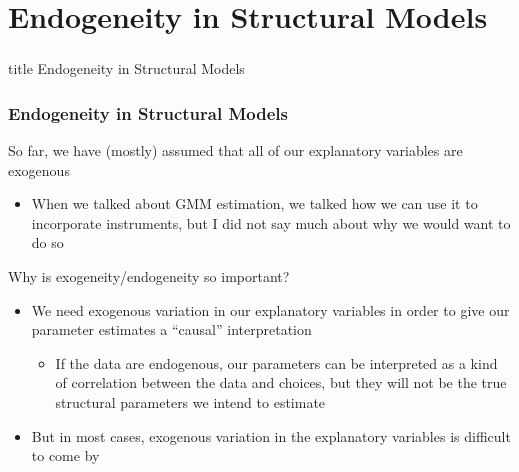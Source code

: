 \documentclass{beamer}
\begin{document}
\section{Endogeneity in Structural Models}
\label{endog}
\begin{frame}\frametitle{}
    \vfill
    \centering
    \begin{beamercolorbox}[center]{title}
        \Large Endogeneity in Structural Models
    \end{beamercolorbox}
    \vfill
\end{frame}

\begin{frame}\frametitle{Endogeneity in Structural Models}
    So far, we have (mostly) assumed that all of our explanatory variables are exogenous
    \begin{itemize}
        \item When we talked about GMM estimation, we talked how we can use it to incorporate instruments, but I did not say much about why we would want to do so
    \end{itemize}
    \vspace{3ex}
    Why is exogeneity/endogeneity so important?
    \begin{itemize}
        \item We need exogenous variation in our explanatory variables in order to give our parameter estimates a ``causal'' interpretation
        \begin{itemize}
        	\item If the data are endogenous, our parameters can be interpreted as a kind of correlation between the data and choices, but they will not be the true structural parameters we intend to estimate
        \end{itemize}
        \item But in most cases, exogenous variation in the explanatory variables is difficult to come by
    \end{itemize}
\end{frame}
\end{document}
